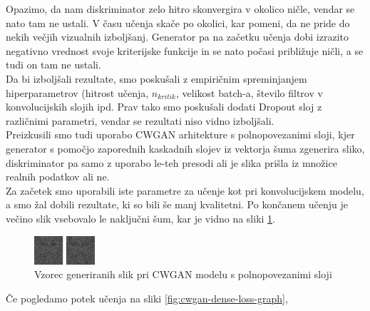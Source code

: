 \documentclass[12pt,a4paper,twoside]{article}
\theoremstyle{definition} %
\theoremstyle{plain} %
\numberwithin{equation}{section}  %
\begin{document}
Opazimo, da nam diskriminator zelo hitro skonvergira v okolico ničle, vendar se nato tam ne ustali. V času učenja  skače po okolici, kar pomeni, da ne pride do nekih večjih vizualnih izboljšanj. Generator pa  na začetku učenja dobi izrazito negativno vrednost svoje kriterijske funkcije in se nato počasi približuje ničli, a se tudi on tam ne ustali. \\
Da bi izboljšali rezultate, smo poskušali z empiričnim spreminjanjem hiperparametrov (hitrost učenja, $n_{kritik}$, velikost batch-a, število filtrov v konvolucijskih slojih ipd. Prav tako smo poskušali dodati Dropout sloj \cite{srivastava2014dropout} z različnimi parametri, vendar se rezultati niso vidno izboljšali. 
\\
Preizkusili smo tudi uporabo CWGAN arhitekture  s polnopovezanimi sloji, kjer generator s pomočjo zaporednih kaskadnih slojev iz vektorja šuma zgenerira sliko, diskriminator pa samo z uporabo le-teh presodi ali je slika prišla iz množice realnih podatkov ali ne. 
\\Za začetek smo uporabili iste parametre za učenje kot pri konvolucijskem modelu, a smo žal dobili rezultate, ki so bili še manj kvalitetni. Po končanem učenju je večino slik vsebovalo le naključni šum, kar je vidno na sliki \ref{fig:cwgan-dense-imgs}. 

\begin{figure}[ht]
  \centering
  \includegraphics[width=0.2\textwidth]{images/cwgan_dense_noise.png}
 \caption[Vzorec generiranih slik pri CWGAN modelu s polnopovezanimi sloji]{Vzorec generiranih slik pri CWGAN modelu s polnopovezanimi sloji}
  \label{fig:cwgan-dense-imgs}
\end{figure}


Če pogledamo potek učenja na sliki \ref{fig:cwgan-dense-loss-graph},
\end{document}
